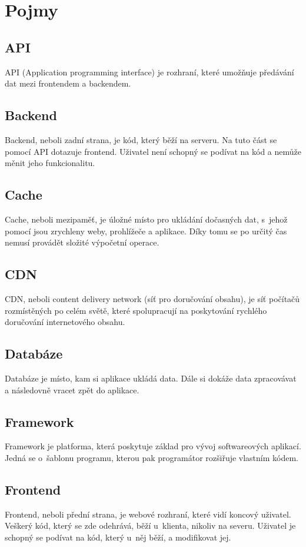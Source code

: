 \section{Pojmy}

\subsection{API}
API (Application programming interface) je rozhraní, které umožňuje předávání dat mezi frontendem a backendem.

\subsection{Backend}
Backend, neboli zadní strana, je kód, který běží na serveru. Na tuto část se pomocí API dotazuje frontend. Uživatel není schopný se podívat na kód a nemůže měnit jeho funkcionalitu.

\subsection{Cache}
Cache, neboli mezipaměť, je úložné místo pro ukládání dočasných dat, s~jehož pomocí jsou zrychleny weby, prohlížeče a aplikace. \cite{Cache} Díky tomu se po určitý čas nemusí provádět složité výpočetní operace.

\subsection{CDN}
CDN, neboli content delivery network (síť pro doručování obsahu), je síť počítačů rozmístěných po celém světě, které spolupracují na poskytování rychlého doručování internetového obsahu.\cite{CDN}

\subsection{Databáze}
Databáze je místo, kam si aplikace ukládá data. Dále si dokáže data zpracovávat a následovně vracet zpět do aplikace.

\subsection{Framework}
Framework je platforma, která poskytuje základ pro vývoj softwareových aplikací. \cite{Framework} Jedná se o~šablonu programu, kterou pak programátor rozšiřuje vlastním kódem.

\subsection{Frontend}
Frontend, neboli přední strana, je webové rozhraní, které vidí koncový uživatel. Veškerý kód, který se zde odehrává, běží u~klienta, nikoliv na severu. Uživatel je schopný se podívat na kód, který u~něj běží, a modifikovat jej.


